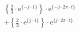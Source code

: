 \[
\begin{split}
&  \left \{ \frac{2}{3} \cdot \textrm{e}^{\{-j \cdot 1 \}} \right \} \cdot \textrm{e}^{\{- j \cdot 2 \pi \cdot t \}}\\
& +\left \{ \frac{2}{3} \cdot \textrm{e}^{\{ j \cdot 1 \}} \right \} \cdot \textrm{e}^{\{  j \cdot 2 \pi \cdot t \}}
\end{split}
\]

